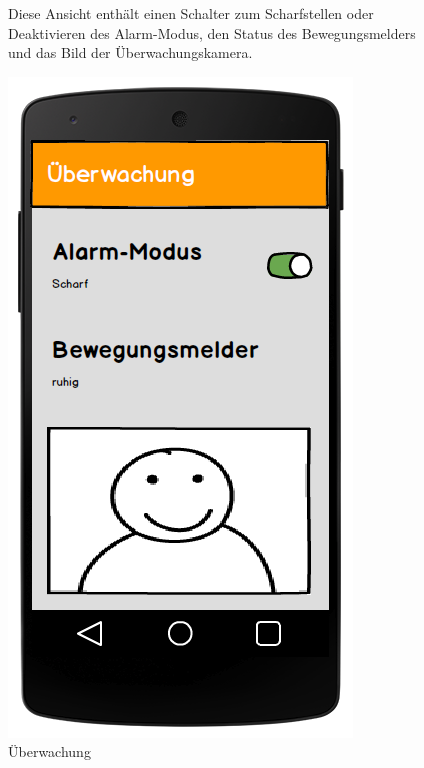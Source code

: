 \begin{figure}[htbp]
	\begin{minipage}{0.6\textwidth} 
Diese Ansicht enthält einen Schalter zum Scharfstellen oder Deaktivieren des Alarm-Modus, den Status des Bewegungsmelders und das Bild der Überwachungskamera. 
	\end{minipage}
	\hfill
	\begin{minipage}{0.32\textwidth}
		\includegraphics[width=\textwidth]{report/img/mockup_camera.png}
		\caption{Überwachung}
		\label{fig:mockupCamera}
	\end{minipage}
\end{figure}

